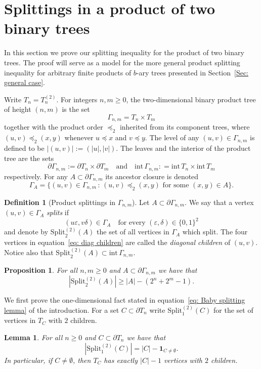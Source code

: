 \documentclass[11pt]{amsart}
\newcommand\labs[1]{\left\lvert#1\right\rvert}
\newcommand{\Split}{\mathrm{Split}}
\newcommand{\inte}{\mathrm{int}\,}
\renewcommand{\geq}{\geqslant}
\theoremstyle{plain}
\newtheorem{lem}[thm]{Lemma}
\newtheorem{pro}[thm]{Proposition}
\theoremstyle{definition}
\newtheorem{defn}[thm]{Definition}
\theoremstyle{remark}
\begin{document}
\section{Splittings in a product of two binary trees}
In this section we prove our splitting inequality for the product of two binary trees. The proof will serve as a model for the more general product splitting inequality for arbitrary finite products of $b$-ary trees presented in Section~\ref{Sec: general case}.

Write $T_n = T_n^{(2)}$. For integers $n,m\geq 0$, the two-dimensional binary product tree of height $(n,m)$ is the set
\[ \Gamma_{n,m} = T_n \times T_m\]
together with the product order $\preceq_2$ inherited from its component trees, where $(u,v) \preceq_2 (x,y)$ whenever $u\preceq x$ and $v\preceq y$. The level of any $(u,v) \in \Gamma_{n,m}$ is defined to be $\labs{(u,v)} := (\labs{u},\labs{v})$. The leaves and the interior of the product tree are the sets
\[ \partial \Gamma_{n,m} := \partial T_n \times \partial T_m \quad \text{and} \quad \inte \Gamma_{n,m}: = \inte T_n \times \inte T_m \]
respectively.
For any $A\subset \partial \Gamma_{n,m}$ its ancestor closure is denoted
\[ \Gamma_A=\{(u,v) \in \Gamma_{n,m} \, : \, (u,v)\preceq_2 (x,y) \text{ for some }(x,y)\in A\}.\]
\begin{defn}[Product splittings in $\Gamma_{n,m}$]
Let $A\subset \partial \Gamma_{n,m}$. We say that a vertex $(u,v) \in \Gamma_A$ \textit{splits} if
\begin{equation}\label{eq: diag children}
(u \varepsilon,v \delta) \in \Gamma_A \quad \text{for every }(\varepsilon,\delta) \in \{0,1\}^2
\end{equation}
and denote by $\Split_2^{(2)}(A)$ the set of all vertices in $\Gamma_A$ which split. The four vertices in equation~\eqref{eq: diag children} are called the \textit{diagonal children} of $(u,v)$. Notice also that $\Split_2^{(2)}(A) \subset \inte \Gamma_{n,m}$.
\end{defn}
\begin{pro}\label{Prop: 2d binary splitting count}
For all $n,m\geq 0$ and $A \subset \partial \Gamma_{n,m}$ we have that
\[ \labs{\Split_2^{(2)}(A)} \geq \labs{A} -(2^n + 2^m -1).\] 
\end{pro}
We first prove the one-dimensional fact stated in equation~\eqref{eq: Baby splitting lemma} of the introduction. For a set $C\subset \partial T_n$ write $\Split_1^{(2)}(C)$ for the set of vertices in $T_C$ with $2$ children.
\begin{lem}\label{Lemma: Baby split lem}
For all $n\geq 0$ and $C\subset \partial T_n$ we have that
\[ \labs{\Split_1^{(2)}(C)} = \labs{C} - \mathbf{1}_{C\neq \emptyset}.\]
In particular, if $C\neq \emptyset$, then $T_C$ has exactly $\labs{C}-1$ vertices with $2$ children.
\end{lem}
\end{document}
